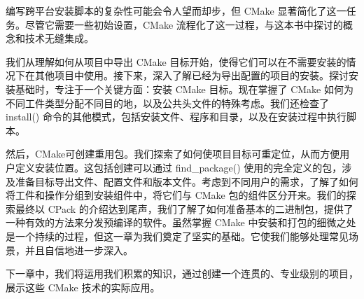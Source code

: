 编写跨平台安装脚本的复杂性可能会令人望而却步，但 CMake 显著简化了这一任务。尽管它需要一些初始设置，CMake 流程化了这一过程，与这本书中探讨的概念和技术无缝集成。

我们从理解如何从项目中导出 CMake 目标开始，使得它们可以在不需要安装的情况下在其他项目中使用。接下来，深入了解已经为导出配置的项目的安装。探讨安装基础时，专注于一个关键方面：安装 CMake 目标。现在掌握了 CMake 如何为不同工件类型分配不同目的地，以及公共头文件的特殊考虑。我们还检查了 install() 命令的其他模式，包括安装文件、程序和目录，以及在安装过程中执行脚本。

然后，CMake可创建重用包。我们探索了如何使项目目标可重定位，从而方便用户定义安装位置。这包括创建可以通过 find\_package() 使用的完全定义的包，涉及准备目标导出文件、配置文件和版本文件。考虑到不同用户的需求，了解了如何将工件和操作分组到安装组件中，将它们与 CMake 包的组件区分开来。我们的探索最终以 CPack 的介绍达到尾声，我们了解了如何准备基本的二进制包，提供了一种有效的方法来分发预编译的软件。虽然掌握 CMake 中安装和打包的细微之处是一个持续的过程，但这一章为我们奠定了坚实的基础。它使我们能够处理常见场景，并且自信地进一步深入。

下一章中，我们将运用我们积累的知识，通过创建一个连贯的、专业级别的项目，展示这些 CMake 技术的实际应用。